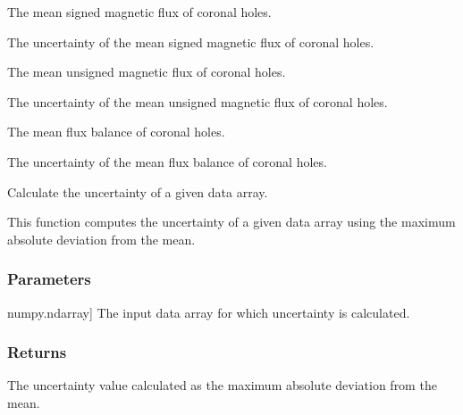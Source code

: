 \documentclass[letterpaper,10pt,english]{sphinxmanual}
\begin{document}
\begin{fulllineitems}
\begin{description}
\sphinxAtStartPar
The mean signed magnetic flux of coronal holes.

\sphinxAtStartPar
The uncertainty of the mean signed magnetic flux of coronal holes.

\sphinxAtStartPar
The mean unsigned magnetic flux of coronal holes.

\sphinxAtStartPar
The uncertainty of the mean unsigned magnetic flux of coronal holes.

\sphinxAtStartPar
The mean flux balance of coronal holes.

\sphinxAtStartPar
The uncertainty of the mean flux balance of coronal holes.

\end{description}

\end{fulllineitems}


\begin{fulllineitems}
\label{\detokenize{pycatch/utils/ch_mapping:pycatch.utils.ch_mapping.catch_uncertainty}}
\pysigstartsignatures
{}
\pysigstopsignatures
\sphinxAtStartPar
Calculate the uncertainty of a given data array.

\sphinxAtStartPar
This function computes the uncertainty of a given data array using the maximum absolute deviation from the mean.


\subsubsection{Parameters}
\label{\detokenize{pycatch/utils/ch_mapping:id5}}\begin{description}
\sphinxlineitem{x}{[}numpy.ndarray{]}
\sphinxAtStartPar
The input data array for which uncertainty is calculated.

\end{description}


\subsubsection{Returns}
\label{\detokenize{pycatch/utils/ch_mapping:id6}}\begin{description}
\sphinxAtStartPar
The uncertainty value calculated as the maximum absolute deviation from the mean.

\end{description}

\end{fulllineitems}
\end{document}
